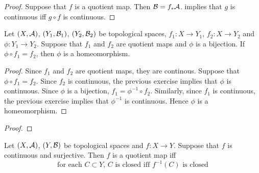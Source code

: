\documentclass{book}
\begin{document}
	\begin{proof}
		Suppose that $f$ is a quotient map. Then $\mathcal{B} = f_* \mathcal{A}$.  implies that $g$ is continuous iff $g \circ f$ is continuous.
	\end{proof}

	\begin{ex}
		Let $(X, \mathcal{A})$, $(Y_1, \mathcal{B}_1)$, $(Y_2, \mathcal{B}_2)$ be topological spaces, $f_1:X \rightarrow Y_1$, $f_2:X \rightarrow Y_2$ and $\phi: Y_1 \rightarrow Y_2$. Suppose that $f_1$ and $f_2$ are quotient maps and $\phi$ is a bijection. If $\phi \circ f_1 = f_2$, then $\phi$ is a homeomorphism. 
	\end{ex}
	
	\begin{proof}
		Since $f_1$ and $f_2$ are quotient maps, they are continous. Suppose that $\phi \circ f_1 = f_2$. Since $f_2$ is continuous, the previous exercise implies that $\phi$ is continuous. Since $\phi$ is a bijection, $f_1 = \phi^{-1} \circ f_2$. Similarly, since $f_1$ is continuous, the previous exercise implies that $\phi^{-1}$ is continuous. Hence $\phi$ is a homeomorphism.
	\end{proof}

	\begin{ex}
	\end{ex}

	\begin{proof}
		
	\end{proof}
	
	\begin{ex} \lex{36003}
	Let $(X, \mathcal{A})$, $(Y, \mathcal{B})$ be topological spaces and $f:X \rightarrow Y$. Suppose that $f$ is continuous and surjective. Then $f$ is a quotient map iff 
	\begin{equation*}
	\text{for each $C \subset Y$, $C$ is closed iff $f^{-1}(C)$ is closed} 
	\end{equation*}	
	\end{ex}
	
\end{document}
